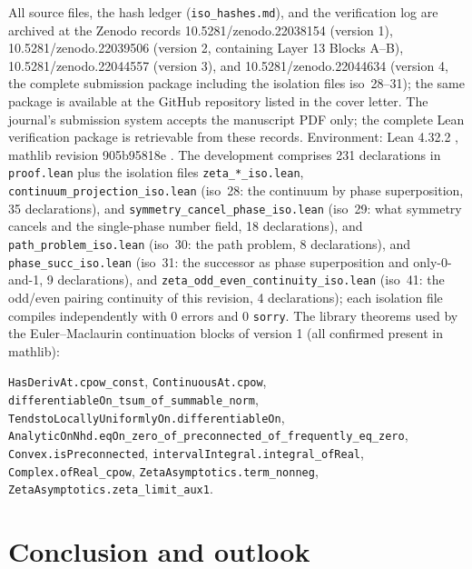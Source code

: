 \documentclass{article}
\begin{document}
All source files, the hash ledger (\texttt{iso\_hashes.md}), and the
verification log are archived at the Zenodo records
10.5281/zenodo.22038154 (version 1),
10.5281/zenodo.22039506 (version 2, containing Layer 13 Blocks A--B),
10.5281/zenodo.22044557 (version 3), and
10.5281/zenodo.22044634 (version 4, the complete submission package
including the isolation files iso~28--31); the same package is
available at the GitHub repository listed in the cover letter. The
journal's submission system accepts the manuscript PDF only; the
complete Lean verification package is retrievable from these records.
Environment: Lean 4.32.2 \cite{lean}, mathlib revision 905b95818e
\cite{mathlib}. The development
comprises 231 declarations in \texttt{proof.lean} plus the isolation files
\texttt{zeta\_*\_iso.lean}, \texttt{continuum\_projection\_iso.lean}
(iso~28: the continuum by phase superposition, 35 declarations), and
\texttt{symmetry\_cancel\_phase\_iso.lean} (iso~29: what symmetry cancels
and the single-phase number field, 18 declarations), and
\texttt{path\_problem\_iso.lean} (iso~30: the path problem, 8
declarations), and \texttt{phase\_succ\_iso.lean} (iso~31: the
successor as phase superposition and only-0-and-1, 9 declarations), and
\texttt{zeta\_odd\_even\_continuity\_iso.lean} (iso~41: the odd/even
pairing continuity of this revision, 4 declarations); each isolation file
compiles independently with
0 errors and 0 \texttt{sorry}. The library theorems used by the Euler--Maclaurin
continuation blocks of version 1 (all confirmed present in mathlib):
{\small\begin{sloppypar}\texttt{HasDerivAt.cpow\_const},
\texttt{ContinuousAt.cpow}, \texttt{differentiableOn\_tsum\_of\_summable\_norm},
\texttt{TendstoLocallyUniformlyOn.differentiableOn},
\texttt{AnalyticOnNhd.eqOn\_zero\_of\_preconnected\_of\_frequently\_eq\_zero},
\texttt{Convex.isPreconnected}, \texttt{intervalIntegral.integral\_ofReal},
\texttt{Complex.ofReal\_cpow}, \texttt{ZetaAsymptotics.term\_nonneg},
\texttt{ZetaAsymptotics.zeta\_limit\_aux1}.\end{sloppypar}}

\section{Conclusion and outlook}
\label{sec:conclusion}
\end{document}
